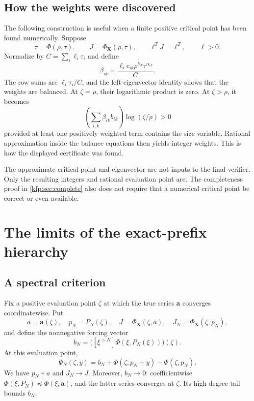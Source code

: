 \documentclass[11pt,a4paper]{article}
\theoremstyle{definition}
\theoremstyle{remark}
\newcommand{\bA}{\boldsymbol a}
\newcommand{\bX}{\boldsymbol X}
\newcommand{\tail}[2]{[\xi^{>#1}]#2}
\begin{document}
\subsection{How the weights were discovered}
The following construction is useful when a finite positive critical point
has been found numerically. Suppose
\[
 \tau=\Phi(\rho,\tau),\qquad
 J=\Phi_{\bX}(\rho,\tau),\qquad
 \ell^TJ=\ell^T,\qquad \ell>0.
\]
Normalize by $C=\sum_i\ell_i\tau_i$ and define
\[
 \beta_{ik}=
 \frac{\ell_i c_{ik}\rho^{b_{ik}}\tau^{\alpha_{ik}}}{C}.
\]
The row sums are $\ell_i\tau_i/C$, and the left-eigenvector identity shows
that the weights are balanced. At $\zeta=\rho$, their logarithmic product
is zero. At $\zeta>\rho$, it becomes
\[
 \left(\sum_{i,k}\beta_{ik}b_{ik}\right)\log(\zeta/\rho)>0
\]
provided at least one positively weighted term contains the size variable.
Rational approximation inside the balance equations then yields integer
weights. This is how the displayed certificate was found.

The approximate critical point and eigenvector are not inputs to the final
verifier. Only the resulting integers and rational evaluation point are.
The completeness proof in \cref{kfp:sec:complete} also does not require that a
numerical critical point be correct or even available.

\section{The limits of the exact-prefix hierarchy}
\label{kfp:sec:stability}

\subsection{A spectral criterion}
Fix a positive evaluation point $\zeta$ at which the true series $\bA$
converges coordinatewise. Put
\[
 a=\bA(\zeta),\quad p_N=P_N(\zeta),\quad
 J=\Phi_{\bX}(\zeta,a),\quad
 J_N=\Phi_{\bX}(\zeta,p_N),
\]
and define the nonnegative forcing vector
\[
 b_N=\bigl(\tail{N}{\Phi(\xi,P_N(\xi))}\bigr)(\zeta).
\]
At this evaluation point,
\begin{equation}\label{kfp:eq:tail-numeric}
 \Psi_N(\zeta,y)=b_N+
       \Phi(\zeta,p_N+y)-\Phi(\zeta,p_N).
\end{equation}
We have $p_N\uparrow a$ and $J_N\to J$. Moreover, $b_N\to0$:
coefficientwise $\Phi(\xi,P_N)\preceq\Phi(\xi,\bA)$, and the latter
series converges at $\zeta$. Its high-degree tail bounds $b_N$.
\end{document}
